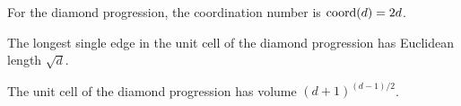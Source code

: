 \begin{theorem}
  \label{thm:coord}
  \notready
  For the diamond progression, the coordination number is $\operatorname{coord}(d) = 2d$.
\end{theorem}

\begin{theorem}
  \label{thm:maxhop}
  \notready
  The longest single edge in the unit cell of the diamond progression has
  Euclidean length $\sqrt{d}$.
\end{theorem}

\begin{theorem}
  \label{thm:volume}
  \notready
  The unit cell of the diamond progression has volume $(d+1)^{(d-1)/2}$.
\end{theorem}
